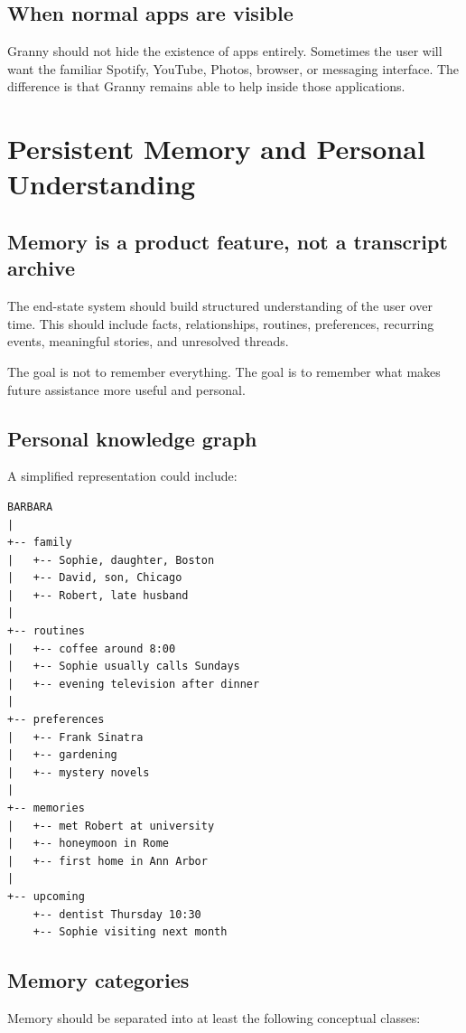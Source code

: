 \documentclass[11pt]{article}
\begin{document}
\subsection{When normal apps are visible}
Granny should not hide the existence of apps entirely. Sometimes the user will want the familiar Spotify, YouTube, Photos, browser, or messaging interface. The difference is that Granny remains able to help inside those applications.

\section{Persistent Memory and Personal Understanding}

\subsection{Memory is a product feature, not a transcript archive}
The end-state system should build structured understanding of the user over time. This should include facts, relationships, routines, preferences, recurring events, meaningful stories, and unresolved threads.

The goal is not to remember everything. The goal is to remember what makes future assistance more useful and personal.

\subsection{Personal knowledge graph}
A simplified representation could include:

\begin{verbatim}
BARBARA
|
+-- family
|   +-- Sophie, daughter, Boston
|   +-- David, son, Chicago
|   +-- Robert, late husband
|
+-- routines
|   +-- coffee around 8:00
|   +-- Sophie usually calls Sundays
|   +-- evening television after dinner
|
+-- preferences
|   +-- Frank Sinatra
|   +-- gardening
|   +-- mystery novels
|
+-- memories
|   +-- met Robert at university
|   +-- honeymoon in Rome
|   +-- first home in Ann Arbor
|
+-- upcoming
    +-- dentist Thursday 10:30
    +-- Sophie visiting next month
\end{verbatim}

\subsection{Memory categories}
Memory should be separated into at least the following conceptual classes:
\end{document}
